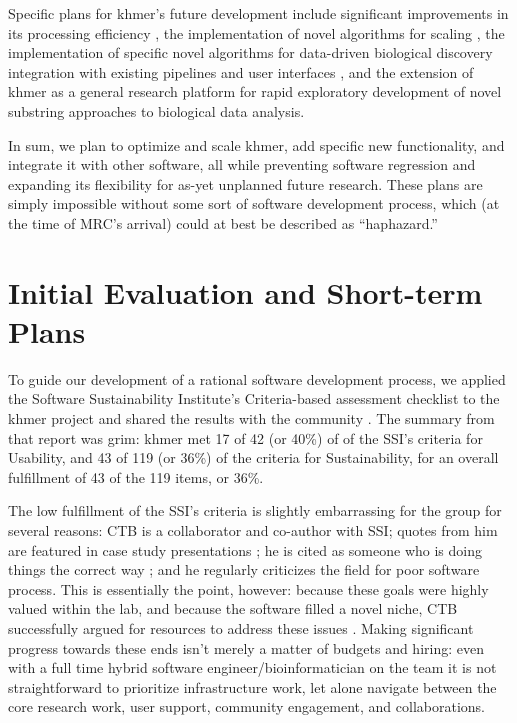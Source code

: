 \documentclass[11pt]{article}
\begin{document}
Specific plans for khmer's future development include significant improvements
in its processing efficiency \cite{DBLP:journals/corr/abs-1303-2223}, the
implementation of novel algorithms for scaling \cite{brown2012CAREER}, the
implementation of specific novel algorithms for data-driven biological
discovery \cite{brown2012bigdata} integration with existing pipelines and user
interfaces \cite{brown2009USDA} \cite{brown2012bigdata}, and the extension of
khmer as a general research platform for rapid exploratory development of novel
substring approaches to biological data analysis.

In sum, we plan to optimize and scale khmer, add specific new
functionality, and integrate it with other software, all while
preventing software regression and expanding its flexibility for
as-yet unplanned future research.  These plans are simply impossible
without some sort of software development process, which (at the time
of MRC's arrival) could at best be described as ``haphazard.''

\section{Initial Evaluation and Short-term Plans}

To guide our development of a rational software development process, we applied
the Software Sustainability Institute's Criteria-based assessment checklist
\cite{SSI-eval-guide} to the khmer project and shared the results with the
community \cite{khmer-assessment}. The summary from that report was grim: khmer
met 17 of 42 (or 40\%) of of the SSI's criteria for Usability, and 43 of 119
(or 36\%) of the criteria for Sustainability, for an overall fulfillment of 43
of the 119 items, or 36\%.

The low fulfillment of the SSI's criteria is slightly embarrassing for the
group for several reasons: CTB is a collaborator and co-author with SSI; quotes
from him are featured in case study presentations \cite{SSI-casestudies}; he is
cited as someone who is doing things the correct way \cite{SSI-recomputation};
and he regularly criticizes the field for poor software process.  This is
essentially the point, however: because these goals were highly valued within
the lab, and because the software filled a novel niche, CTB successfully argued
for resources to address these issues \cite{khmer-future}.  Making significant
progress towards these ends isn't merely a matter of budgets and hiring: even
with a full time hybrid software engineer/bioinformatician on the team it is
not straightforward to prioritize infrastructure work, let alone navigate
between the core research work, user support, community engagement, and
collaborations.
\end{document}
